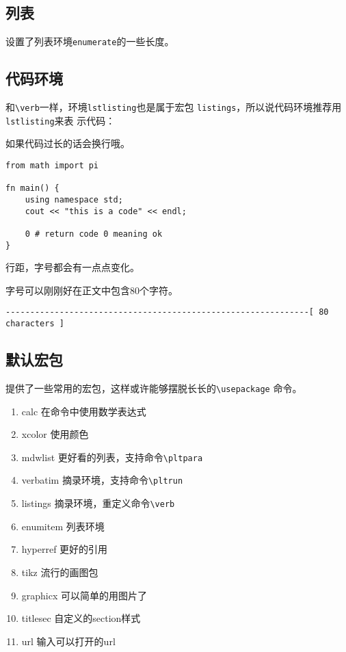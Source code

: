 \documentclass{peterlitsdoc}
\newcommand{\vb}{\verb}
\begin{document}

\subsection{列表}

设置了列表环境\vb|enumerate|的一些长度。


\subsection{代码环境}

和\verb|\verb|一样，环境\vb|lstlisting|也是属于宏包
\vb|listings|，所以说代码环境推荐用\vb|lstlisting|来表
示代码：

\begin{pltrun}
如果代码过长的话会换行哦。
\begin{lstlisting}
from math import pi

fn main() {
    using namespace std;
    cout << "this is a code" << endl;

    0 # return code 0 meaning ok
}
\end{lstlisting}

行距，字号都会有一点点变化。
\end{pltrun}

字号可以刚刚好在正文中包含80个字符。
\begin{lstlisting}
--------------------------------------------------------------[ 80 characters ]
\end{lstlisting}


\subsection{默认宏包}

提供了一些常用的宏包，这样或许能够摆脱长长的\vb|\usepackage|
命令。

\begin{enumerate}
    \item calc          \hfill 在命令中使用数学表达式
    \item xcolor        \hfill 使用颜色
    \item mdwlist
          \hfill 更好看的列表，支持命令\vb|\pltpara|
    \item verbatim      \hfill 摘录环境，支持命令\vb|\pltrun|
    \item listings      \hfill 摘录环境，重定义命令\verb|\verb|
    \item enumitem      \hfill 列表环境
    \item hyperref      \hfill 更好的引用
    \item tikz          \hfill 流行的画图包
    \item graphicx      \hfill 可以简单的用图片了
    \item titlesec      \hfill 自定义的section样式
    \item url           \hfill 输入可以打开的url
\end{enumerate}
\end{document}
